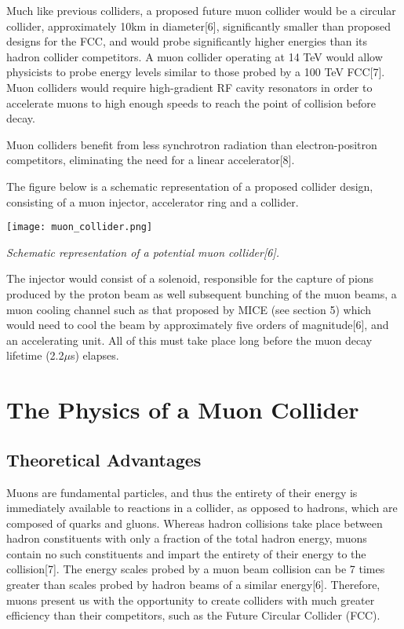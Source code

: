\documentclass{article}
\begin{document}
	\par Much like previous colliders, a proposed future muon collider would be a circular collider, approximately 10km in diameter[6], significantly smaller than proposed designs for the FCC, and would probe significantly higher energies than its hadron collider competitors. A muon collider operating at 14 TeV would allow physicists to probe energy levels similar to those probed by a 100 TeV FCC[7]. Muon colliders would require high-gradient RF cavity resonators in order to accelerate muons to high enough speeds to reach the point of collision before decay.
	\par Muon colliders benefit from less synchrotron radiation than electron-positron competitors, eliminating the need for a linear accelerator[8].
	\par The figure below is a schematic representation of a proposed collider design, consisting of a muon injector, accelerator ring and a collider.
	
	\begin{center}
		\texttt{[image: muon\_collider.png]}
		\par \textit{Schematic representation of a potential muon collider[6].}
	\end{center}
	
	
	
	
	\par The injector would consist of a solenoid, responsible for the capture of pions produced by the proton beam as well subsequent bunching of the muon beams, a muon cooling channel such as that proposed by MICE (see section 5) which would need to cool the beam by approximately five orders of magnitude[6], and an accelerating unit. All of this must take place long before the muon decay lifetime (2.2$\mu$s) elapses.
	
	\section{The Physics of a Muon Collider}
	
	\subsection{Theoretical Advantages}
	
	
	\par Muons are fundamental particles, and thus the entirety of their energy is immediately available to reactions in a collider, as opposed to hadrons, which are composed of quarks and gluons. Whereas hadron collisions take place between hadron constituents with only a fraction of the total hadron energy, muons contain no such constituents and impart the entirety of their energy to the collision[7]. The energy scales probed by a muon beam collision can be 7 times greater than scales probed by hadron beams of a similar energy[6]. Therefore, muons present us with the opportunity to create colliders with much greater efficiency than their competitors, such as the Future Circular Collider (FCC). 
	
\end{document}
